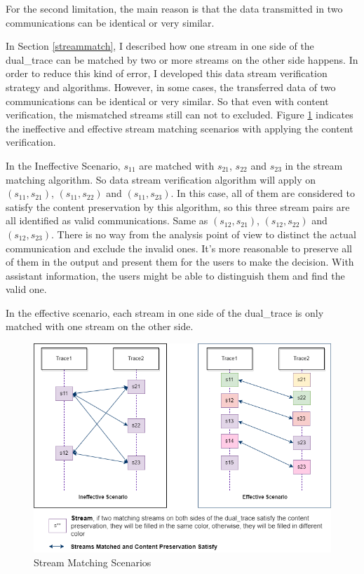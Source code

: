 For the second limitation, the main reason is that the data transmitted in two communications can be identical or very similar. 

In Section \ref{streammatch}, I described how one stream in one side of the dual\_trace can be matched by two or more streams on the other side happens. In order to reduce this kind of error, I developed this data stream verification strategy and algorithms. However, in some cases, the transferred data of two communications can be identical or very similar. So that even with content verification, the mismatched streams still can not to excluded. Figure \ref{secondlevelmatching} indicates the ineffective and effective stream matching scenarios with applying the content verification. 
    
    In the Ineffective Scenario, $s_{11}$ are matched with $s_{21}$, $s_{22}$ and $s_{23}$ in the stream matching algorithm. So data stream verification algorithm will apply on $(s_{11}, s_{21})$, $(s_{11}, s_{22})$ and $(s_{11}, s_{23})$. In this case, all of them are considered to satisfy the content preservation by this algorithm, so this three stream pairs are all identified as valid communications. Same as $(s_{12}, s_{21})$, $(s_{12}, s_{22})$ and $(s_{12}, s_{23})$. There is no way from the analysis point of view to distinct the actual communication and exclude the invalid ones. It's more reasonable to preserve all of them in the output and present them for the users to make the decision. With assistant information, the users might be able to distinguish them and find the valid one.
    
In the effective scenario, each stream in one side of the dual\_trace is only matched with one stream on the other side.

\begin{figure}[H]
\centerline{\includegraphics[scale=0.6]{Figures/secondlevelmatching}}
 \caption{Stream Matching Scenarios}
\label{secondlevelmatching}
\end{figure}



